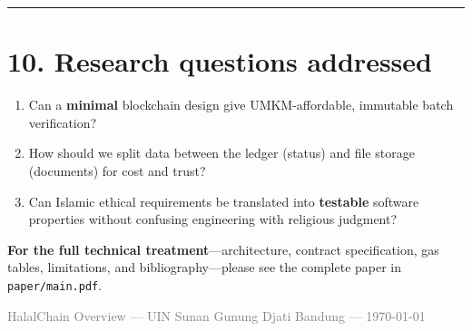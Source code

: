 \documentclass[11pt,a4paper]{article}
\newcommand{\sectionline}{\vspace{0.3em}\noindent\rule{\textwidth}{0.6pt}\vspace{0.6em}}
\begin{document}
\sectionline

\section*{10. Research questions addressed}

\begin{enumerate}[leftmargin=1.4em, itemsep=0.3em]
  \item Can a \textbf{minimal} blockchain design give UMKM-affordable, immutable batch verification?
  \item How should we split data between the ledger (status) and file storage (documents) for cost and trust?
  \item Can Islamic ethical requirements be translated into \textbf{testable} software properties without confusing engineering with religious judgment?
\end{enumerate}

\vspace{0.8em}
\noindent
\textbf{For the full technical treatment}---architecture, contract specification, gas tables, limitations, and bibliography---please see the complete paper in \texttt{paper/main.pdf}.

\vfill
\begin{center}
\small
\textcolor{gray}{HalalChain Overview --- UIN Sunan Gunung Djati Bandung --- \today}
\end{center}
\end{document}
